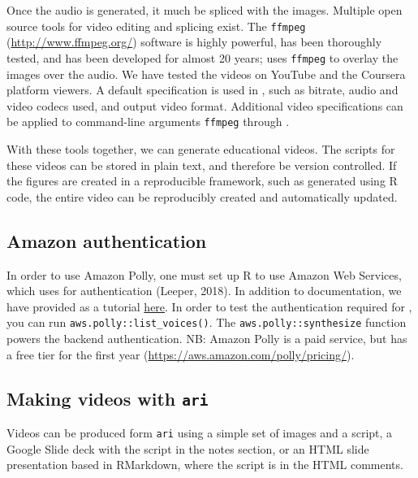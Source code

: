 Once the audio is generated, it much be spliced with the images.
Multiple open source tools for video editing and splicing exist. The
\texttt{ffmpeg} (\url{http://www.ffmpeg.org/}) software is highly
powerful, has been thoroughly tested, and has been developed for almost
20 years;  uses \texttt{ffmpeg} to overlay the images over the
audio. We have tested the videos on YouTube and the Coursera platform
viewers. A default specification is used in , such as bitrate,
audio and video codecs used, and output video format. Additional video
specifications can be applied to command-line arguments \texttt{ffmpeg}
through .

With these tools together, we can generate educational videos. The
scripts for these videos can be stored in plain text, and therefore be
version controlled. If the figures are created in a reproducible
framework, such as generated using R code, the entire video can be
reproducibly created and automatically updated.

\hypertarget{amazon-authentication}{%
\subsection{Amazon authentication}\label{amazon-authentication}}

In order to use Amazon Polly, one must set up R to use Amazon Web
Services, which uses  for authentication (Leeper,
2018). In addition to  documentation, we have
provided as a tutorial
\href{http://seankross.com/2017/05/02/Access-Amazon-Web-Services-in-R.html}{here}.
In order to test the authentication required for , you can run
\texttt{aws.polly::list\_voices()}. The \texttt{aws.polly::synthesize}
function powers the backend authentication. NB: Amazon Polly is a paid
service, but has a free tier for the first year
(\url{https://aws.amazon.com/polly/pricing/}).

\hypertarget{making-videos-with-ari}{%
\subsection{\texorpdfstring{Making videos with
\texttt{ari}}{Making videos with ari}}\label{making-videos-with-ari}}

Videos can be produced form \texttt{ari} using a simple set of images
and a script, a Google Slide deck with the script in the notes section,
or an HTML slide presentation based in RMarkdown, where the script is in
the HTML comments.


